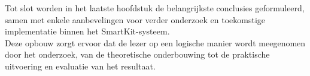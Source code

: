 Tot slot worden in het laatste hoofdstuk de belangrijkste conclusies geformuleerd, samen met enkele aanbevelingen voor verder onderzoek en toekomstige implementatie binnen het SmartKit-systeem.\\

Deze opbouw zorgt ervoor dat de lezer op een logische manier wordt meegenomen door het onderzoek, van de theoretische onderbouwing tot de praktische uitvoering en evaluatie van het resultaat.

